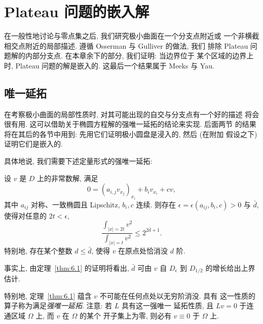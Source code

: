 \chapter{Plateau 问题的嵌入解}
\label{chap:6}

{\setlength{\emergencystretch}{2em}%
在一般性地讨论与零点集之后, 我们研究极小曲面在一个分支点附近或
一个非横截相交点附近的局部描述. 遵循 Osserman 与 Gulliver 的做法, 我们
排除 Plateau 问题解的内部分支点. 在本章余下的部分, 我们证明: 当边界位于
某个区域的边界上时, Plateau 问题的解是嵌入的. 这最后一个结果属于
Meeks 与 Yau.\par}

\section{唯一延拓}
\label{sec:6.1}

在考察极小曲面的局部性质时, 对其可能出现的自交与分支点有一个好的描述
将会很有用. 这可以借助关于椭圆方程解的强唯一延拓的结论来实现. 后面两节
的结果将在其后的各节中用到: 先用它们证明极小圆盘是浸入的, 然后 (在附加
假设之下) 证明它们是嵌入的.

具体地说, 我们需要下述定量形式的强唯一延拓:

\begin{theorem}[定量强唯一延拓]
\label{thm:6.1}
设 $v$ 是 $D$ 上的非常数解, 满足
\begin{equation}
0=(a_{i,j}v_{x_j})_{x_i}+b_iv_{x_i}+cv,
\label{eq:6.1}
\end{equation}
其中 $a_{ij}$ 对称、一致椭圆且 Lipschitz, $b_i,c$ 连续. 则存在
$\epsilon=\epsilon(a_{ij},b_i,c)>0$ 与 $\bar{d}$, 使得对任意的
$2t<\epsilon$,
\begin{equation}
\frac{\int_{|x|=2t}v^2}{\int_{|x|=t}v^2}\leq 2^{2\bar{d}+1}.
\label{eq:6.2}
\end{equation}
特别地, 存在某个整数 $d\leq\bar{d}$, 使得 $v$ 在原点处恰消没 $d$ 阶.
\end{theorem}

事实上, 由定理~\ref{thm:6.1} 的证明将看出, $\bar{d}$ 可由 $v$
自 $D_\epsilon$ 到 $D_{1/2}$ 的增长给出上界估计.

\begin{remark}
\label{rem:6.2}
特别地, 定理~\ref{thm:6.1} 蕴含 $v$ 不可能在任何点处以无穷阶消没. 具有
这一性质的算子称为满足\emph{强唯一延拓}. 注意: 若 $L$ 具有这一强唯一
延拓性质, 且 $Lv=0$ 于连通区域 $\Omega$ 上, 而 $v$ 在 $\Omega$ 的某个
开子集上为零, 则必有 $v\equiv0$ 于 $\Omega$ 上.
\end{remark}

